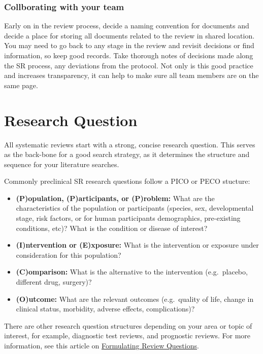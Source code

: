 \documentclass[
]{book}
\providecommand{\tightlist}{%
  \setlength{\itemsep}{0pt}\setlength{\parskip}{0pt}}
\begin{document}
\hypertarget{collborating-with-your-team}{%
\subsection{Collborating with your team}\label{collborating-with-your-team}}

Early on in the review process, decide a naming convention for documents and decide a place for storing all documents related to the review in shared location. You may need to go back to any stage in the review and revisit decisions or find information, so keep good records. Take thorough notes of decisions made along the SR process, any deviations from the protocol. Not only is this good practice and increases transparency, it can help to make sure all team members are on the same page.

\hypertarget{researchquestion}{%
\chapter{Research Question}\label{researchquestion}}

All systematic reviews start with a strong, concise research question. This serves as the back-bone for a good search strategy, as it determines the structure and sequence for your literature searches.

Commonly preclinical SR research questions follow a PICO or PECO stucture:

\begin{itemize}
\tightlist
\item
  \textbf{(P)opulation, (P)articipants, or (P)roblem:} What are the characteristics of the population or participants (species, sex, developmental stage, risk factors, or for human participants demographics, pre-existing conditions, etc)? What is the condition or disease of interest?
\item
  \textbf{(I)ntervention or (E)xposure:} What is the intervention or exposure under consideration for this population?
\item
  \textbf{(C)omparison:} What is the alternative to the intervention (e.g.~placebo, different drug, surgery)?
\item
  \textbf{(O)utcome:} What are the relevant outcomes (e.g.~quality of life, change in clinical status, morbidity, adverse effects, complications)?
\end{itemize}

There are other research question structures depending on your area or topic of interest, for example, diagnostic test reviews, and prognostic reviews.
For more information, see this article on \href{https://journals.library.ualberta.ca/eblip/index.php/EBLIP/article/view/9741/8144}{Formulating Review Questions}.
\end{document}
